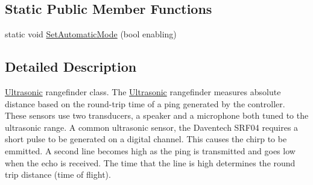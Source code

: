 \subsection*{\-Static \-Public \-Member \-Functions}
\begin{DoxyCompactItemize}
\item 
static void \hyperlink{classUltrasonic_a16105fb0a316d780b8ea1554e3109825}{\-Set\-Automatic\-Mode} (bool enabling)
\end{DoxyCompactItemize}


\subsection{\-Detailed \-Description}
\hyperlink{classUltrasonic}{\-Ultrasonic} rangefinder class. \-The \hyperlink{classUltrasonic}{\-Ultrasonic} rangefinder measures absolute distance based on the round-\/trip time of a ping generated by the controller. \-These sensors use two transducers, a speaker and a microphone both tuned to the ultrasonic range. \-A common ultrasonic sensor, the \-Daventech \-S\-R\-F04 requires a short pulse to be generated on a digital channel. \-This causes the chirp to be emmitted. \-A second line becomes high as the ping is transmitted and goes low when the echo is received. \-The time that the line is high determines the round trip distance (time of flight). 

